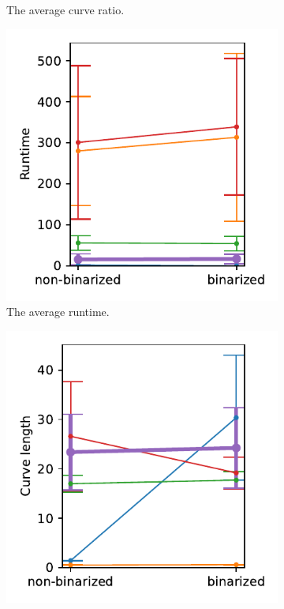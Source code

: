 \begin{figure}[h]
\begin{subfigure}{.3\textwidth}
    \caption{The average curve ratio.}
\end{subfigure}
    \begin{subfigure}{.3\textwidth}
    \centering
    \includegraphics[width=\textwidth]{graphics/eval/runtime_True_1024-1.024_sketchbench.pdf}
    \caption{The average runtime.}
\end{subfigure}
    \begin{subfigure}{.3\textwidth}
    \centering
    \includegraphics[width=\textwidth]{graphics/eval/curve length_True_1024-1.024_sketchbench.pdf}

\end{subfigure}
\end{figure}
